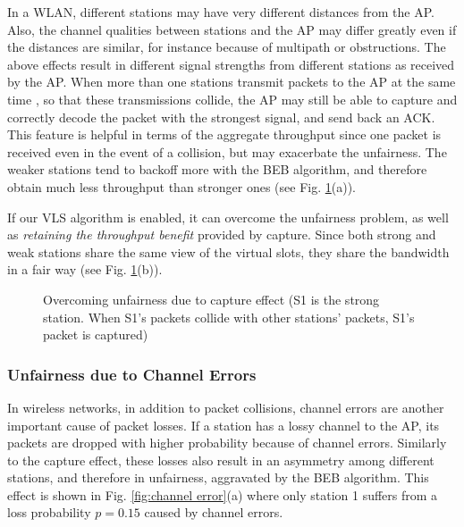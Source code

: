 \documentclass[letterpaper, 10 pt, conference]{ieeeconf}
\begin{document}
In a WLAN, different stations may have very different distances from
the AP. Also, the channel qualities between stations and the AP may
differ greatly even if the distances are similar, for instance because of multipath
or obstructions. The above effects result in different signal strengths
from different stations as received by the AP. When more than one
stations transmit packets to the AP at the same time , so that these
transmissions collide, the AP may still be able to
capture and correctly decode the packet with the strongest signal,
and send back an ACK. This feature is helpful in terms of the aggregate
throughput since one packet is received even in the event of a collision, but may
exacerbate the unfairness. The weaker stations tend to backoff more
with the BEB algorithm, and therefore obtain much less throughput than stronger ones
(see Fig. \ref{fig:capture}(a)).

If our VLS algorithm is enabled, it can overcome the unfairness problem,
as well as \emph{retaining the throughput benefit} provided by capture. Since both strong and weak stations
share the same view of the virtual slots, they share the bandwidth
in a fair way (see Fig. \ref{fig:capture}(b)).

\begin{figure}


\caption{\label{fig:capture}Overcoming unfairness due to capture effect (S1 is the strong station. When S1's packets collide with other stations' packets, S1's packet is captured)}

\end{figure}



\subsubsection{Unfairness due to Channel Errors}

In wireless networks, in addition to packet collisions, channel errors are another
important cause of packet losses. If a station has a lossy
channel to the AP, its packets are dropped with higher probability
because of channel errors. Similarly to the capture effect, these losses also result in
an asymmetry among different stations, and therefore in unfairness, aggravated
by the BEB algorithm. This effect is shown in Fig. \ref{fig:channel error}(a) where
only station 1 suffers from a loss probability $p=0.15$ caused by
channel errors.
\end{document}
